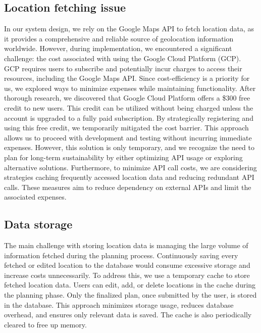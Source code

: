 \subsection{Location fetching issue}
In our system design, we rely on the Google Maps API to fetch location data, as it provides a
comprehensive and reliable source of geolocation information worldwide. However, during
implementation, we encountered a significant challenge: the cost associated with using the
Google Cloud Platform (GCP). GCP requires users to subscribe and potentially incur charges to
access their resources, including the Google Maps API. Since cost-efficiency is a priority for us,
we explored ways to minimize expenses while maintaining functionality. After thorough
research, we discovered that Google Cloud Platform offers a \$300 free credit to new users. This
credit can be utilized without being charged unless the account is upgraded to a fully paid
subscription. By strategically registering and using this free credit, we temporarily mitigated the
cost barrier. This approach allows us to proceed with development and testing without incurring
immediate expenses. However, this solution is only temporary, and we recognize the need to plan
for long-term sustainability by either optimizing API usage or exploring alternative solutions.
Furthermore, to minimize API call costs, we are considering strategies caching frequently
accessed location data and reducing redundant API calls. These measures aim to reduce
dependency on external APIs and limit the associated expenses.

\subsection{Data storage}
The main challenge with storing location data is managing the large volume of information
fetched during the planning process. Continuously saving every fetched or edited location to the
database would consume excessive storage and increase costs unnecessarily. To address this, we
use a temporary cache to store fetched location data. Users can edit, add, or delete locations in
the cache during the planning phase. Only the finalized plan, once submitted by the user, is
stored in the database. This approach minimizes storage usage, reduces database overhead, and
ensures only relevant data is saved. The cache is also periodically cleared to free up memory.

